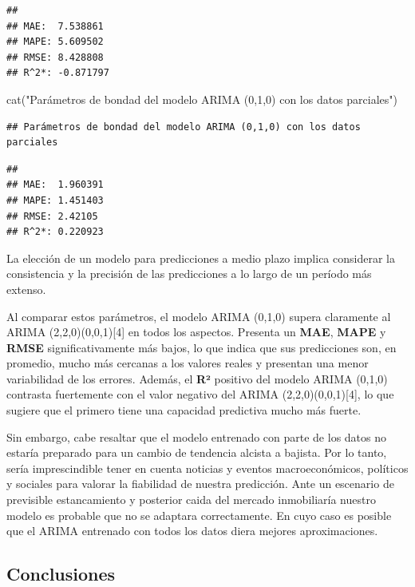\documentclass[
]{article}
\newenvironment{Shaded}{\begin{snugshade}}{\end{snugshade}}
\newcommand{\FunctionTok}[1]{\textcolor[rgb]{0.00,0.00,0.00}{#1}}
\newcommand{\NormalTok}[1]{#1}
\newcommand{\SpecialCharTok}[1]{\textcolor[rgb]{0.00,0.00,0.00}{#1}}
\newcommand{\StringTok}[1]{\textcolor[rgb]{0.31,0.60,0.02}{#1}}
\begin{document}
\begin{verbatim}
## 
## MAE:  7.538861 
## MAPE: 5.609502 
## RMSE: 8.428808 
## R^2*: -0.871797
\end{verbatim}

\begin{Shaded}
\begin{Highlighting}[]
\FunctionTok{cat}\NormalTok{(}\StringTok{"Parámetros de bondad del modelo ARIMA (0,1,0) con los datos parciales"}\NormalTok{)}
\end{Highlighting}
\end{Shaded}

\begin{verbatim}
## Parámetros de bondad del modelo ARIMA (0,1,0) con los datos parciales
\end{verbatim}

\begin{Shaded}
\end{Shaded}

\begin{verbatim}
## 
## MAE:  1.960391 
## MAPE: 1.451403 
## RMSE: 2.42105 
## R^2*: 0.220923
\end{verbatim}

La elección de un modelo para predicciones a medio plazo implica
considerar la consistencia y la precisión de las predicciones a lo largo
de un período más extenso.

Al comparar estos parámetros, el modelo ARIMA (0,1,0) supera claramente
al ARIMA (2,2,0)(0,0,1){[}4{]} en todos los aspectos. Presenta un
\textbf{MAE}, \textbf{MAPE} y \textbf{RMSE} significativamente más
bajos, lo que indica que sus predicciones son, en promedio, mucho más
cercanas a los valores reales y presentan una menor variabilidad de los
errores. Además, el \textbf{R²} positivo del modelo ARIMA (0,1,0)
contrasta fuertemente con el valor negativo del ARIMA
(2,2,0)(0,0,1){[}4{]}, lo que sugiere que el primero tiene una capacidad
predictiva mucho más fuerte.

Sin embargo, cabe resaltar que el modelo entrenado con parte de los
datos no estaría preparado para un cambio de tendencia alcista a
bajista. Por lo tanto, sería imprescindible tener en cuenta noticias y
eventos macroeconómicos, políticos y sociales para valorar la fiabilidad
de nuestra predicción. Ante un escenario de previsible estancamiento y
posterior caida del mercado inmobiliaría nuestro modelo es probable que
no se adaptara correctamente. En cuyo caso es posible que el ARIMA
entrenado con todos los datos diera mejores aproximaciones.

\hypertarget{conclusiones}{%
\subsection{Conclusiones}\label{conclusiones}}
\end{document}
